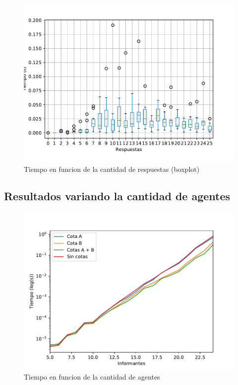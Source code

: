 \documentclass{article}
\begin{document}
\begin{figure}
\caption{Tiempo en funcion de la cantidad de respuestas (boxplot)}
\centering
\includegraphics[scale=0.5]{Respuestas_box_st.pdf}
\end{figure}


\subsection{Resultados variando la cantidad de agentes}

\begin{figure}
\caption{Tiempo en funcion de la cantidad de agentes}
\centering
\includegraphics[scale=0.5]{Agentes_st.pdf}
\end{figure}
\end{document}
